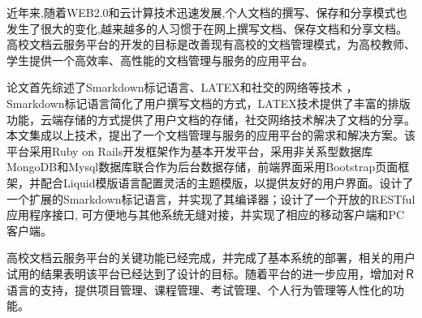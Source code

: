 
\begin{cabstract}
近年来,随着WEB2.0和云计算技术迅速发展,个人文档的撰写、保存和分享模式也发生了很大的变化,越来越多的人习惯于在网上撰写文档、保存文档和分享文档。高校文档云服务平台的开发的目标是改善现有高校的文档管理模式，为高校教师、学生提供一个高效率、高性能的文档管理与服务的应用平台。

论文首先综述了Smarkdown标记语言、LATEX和社交的网络等技术 ，Smarkdown标记语言简化了用户撰写文档的方式，LATEX技术提供了丰富的排版功能，云端存储的方式提供了用户文档的存储，社交网络技术解决了文档的分享。本文集成以上技术，提出了一个文档管理与服务的应用平台的需求和解决方案。该平台采用Ruby on Rails开发框架作为基本开发平台，采用非关系型数据库MongoDB和Mysql数据库联合作为后台数据存储，前端界面采用Bootstrap页面框架，并配合Liquid模版语言配置灵活的主题模版，以提供友好的用户界面。设计了一个扩展的Smarkdown标记语言，并实现了其编译器；设计了一个开放的RESTful应用程序接口, 可方便地与其他系统无缝对接，并实现了相应的移动客户端和PC客户端。

高校文档云服务平台的关键功能已经完成，并完成了基本系统的部署，相关的用户试用的结果表明该平台已经达到了设计的目标。随着平台的进一步应用，增加对Ｒ语言的支持，提供项目管理、课程管理、考试管理、个人行为管理等人性化的功能。
\end{cabstract}


